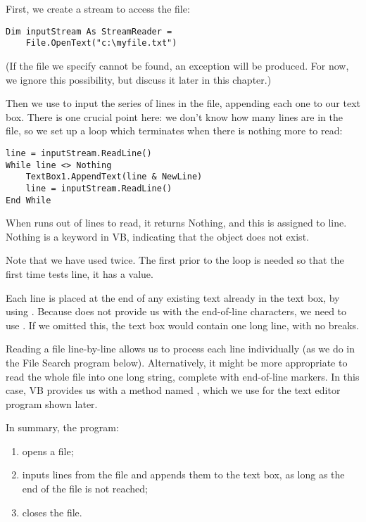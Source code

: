 		First, we create a stream to access the file:
		\begin{lstlisting}
Dim inputStream As StreamReader =
	File.OpenText("c:\myfile.txt")
		\end{lstlisting}
		(If the file we specify cannot be found, an exception will be produced. For now, we ignore this possibility, but discuss it later in this chapter.)

		Then we use  to input the series of lines in the file, appending each one to our text box. There is one crucial point here: we don't know how many lines are in the file, so we set up a loop which terminates when there is nothing more to read:
		\begin{lstlisting}
line = inputStream.ReadLine()
While line <> Nothing
	TextBox1.AppendText(line & NewLine)
	line = inputStream.ReadLine()
End While
		\end{lstlisting}
		When  runs out of lines to read, it returns Nothing, and this is assigned to line. Nothing is a keyword in VB, indicating that the object does not exist.
		
		Note that we have used  twice. The first  prior to the loop is needed so that the first time  tests line, it has a value.
		
		Each line is placed at the end of any existing text already in the text box, by using . Because  does not provide us with the end-of-line characters, we need to use . If we omitted this, the text box would contain one long line, with no breaks.
		
		Reading a file line-by-line allows us to process each line individually (as we do in the File Search program below). Alternatively, it might be more appropriate to read the whole file into one long string, complete with end-of-line markers. In this case, VB provides us with a method named , which we use for the text editor program shown later.

		In summary, the program:
		\begin{enumerate}
			\item	opens a file;
			\item	inputs lines from the file and appends them to the text box, as long as the end of the file is not reached;
			\item	closes the file.
		\end{enumerate}


